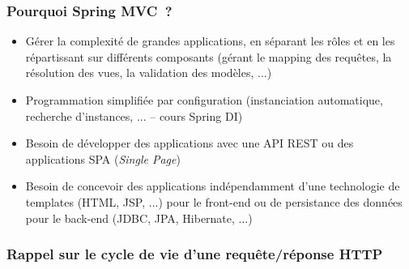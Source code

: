 \documentclass{beamer}
\begin{document}
\begin{frame}
  \frametitle{Pourquoi Spring MVC~?}
  \begin{itemize}
  \item Gérer la complexité de grandes applications, en séparant les rôles et en les répartissant sur différents composants (gérant le mapping des requêtes, la résolution des vues, la validation des modèles, ...)
  \item Programmation simplifiée par configuration (instanciation automatique, recherche d'instances, ... -- cours Spring DI)
  \item Besoin de développer des applications avec une API REST ou des applications SPA (\textit{Single Page})
  \item Besoin de concevoir des applications indépendamment d'une technologie de templates (HTML, JSP, ...) pour le front-end ou de persistance des données pour le back-end (JDBC, JPA, Hibernate, ...)
  \end{itemize}
\end{frame}

\begin{frame}
	\frametitle{Rappel sur le cycle de vie d'une requête/réponse HTTP}
\end{frame}

%
\end{document}
